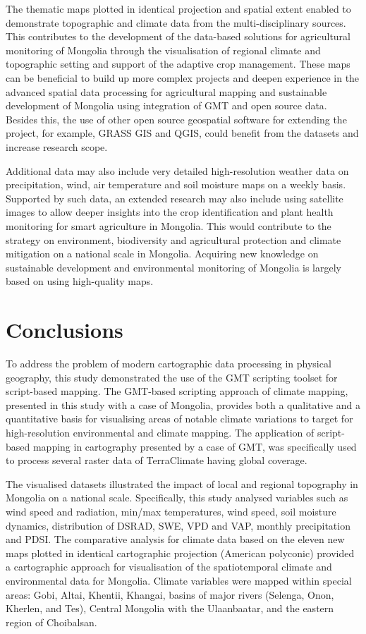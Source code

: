 \documentclass[geosciences,article,accept,pdftex,oneauthor]{Definitions/mdpi}
\begin{document}
The thematic maps plotted in identical projection and spatial extent enabled to demonstrate topographic and climate data from the multi-disciplinary sources. This contributes to the development of the data-based solutions for agricultural monitoring of Mongolia through the visualisation of regional climate and topographic setting and support of the adaptive crop management. {These maps can be beneficial to build up more complex projects and deepen experience in the advanced spatial data processing for agricultural mapping and sustainable development of Mongolia using integration of GMT and open source data. Besides this, the use of other open source geospatial software for extending the project, for example, GRASS GIS and QGIS, could benefit from the datasets and increase research scope.}

Additional data may also include very detailed high-resolution weather data on precipitation, wind, air temperature and soil moisture maps on a weekly basis. Supported by such data, an extended research may also include using satellite images to allow deeper insights into the crop identification and plant health monitoring for smart agriculture in Mongolia. This would contribute to the strategy on environment, biodiversity and agricultural protection and climate mitigation on a national scale in Mongolia. Acquiring new knowledge on sustainable development and environmental monitoring of Mongolia is largely based on using high-quality maps.

\section{Conclusions}

To address the problem of modern cartographic data processing in physical geography, this study demonstrated the use of the GMT scripting toolset for script-based mapping. The GMT-based scripting approach of climate mapping, presented in this study with a case of Mongolia, provides both a qualitative and a quantitative basis for visualising areas of notable climate variations to target for high-resolution environmental and climate mapping. The application of script-based mapping in cartography presented by a case of GMT, was specifically used to process several raster data of TerraClimate having global coverage. 

The visualised datasets illustrated the impact of local and regional topography in Mongolia on a national scale. Specifically, this study analysed variables such as wind speed and radiation, min/max temperatures, wind speed, soil moisture dynamics, distribution of DSRAD, SWE, VPD and VAP, monthly precipitation and PDSI. The comparative analysis for climate data based on the eleven new maps plotted in identical cartographic projection (American polyconic) provided a cartographic approach for visualisation of the spatiotemporal climate and environmental data for Mongolia. Climate variables were mapped within special areas: Gobi, Altai, Khentii, Khangai, basins of major rivers (Selenga, Onon, Kherlen, and Tes), Central Mongolia with the Ulaanbaatar, and the eastern region of Choibalsan.
\end{document}
